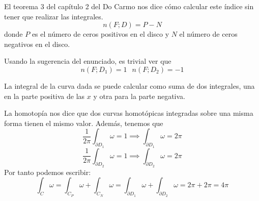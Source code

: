 \begin{problem}[7]
El teorema 3 del capítulo 2 del Do Carmo nos dice cómo calcular este índice sin tener que realizar las integrales.
\[n(F;D)=P-N\]
donde $P$ es el número de ceros positivos en el disco y $N$ el número de ceros negativos en el disco.

Usando la sugerencia del enunciado, es trivial ver que
\[n(F;D_1)=1 \ \; \ n(F;D_2)=-1\]

\spart

La integral de la curva dada se puede calcular como suma de dos integrales, una en la parte positiva de las $x$ y otra para la parte negativa.

La homotopía nos dice que dos curvas homotópicas integradas sobre una misma forma tienen el mismo valor.
Además, tenemos que
\[\frac{1}{2π}\int_{∂D_1} ω = 1 \implies \int_{∂D_1} ω = 2π\]
\[\frac{1}{2π}\int_{∂D_2} ω = 1 \implies \int_{∂D_2} ω = 2π\]
Por tanto podemos escribir:
\[\int_C ω = \int_{C_P} ω + \int_{C_N}ω = \int_{\partial D_1} ω + \int_{\partial D_2} ω = 2π+2π = 4π\]

\end{problem}

